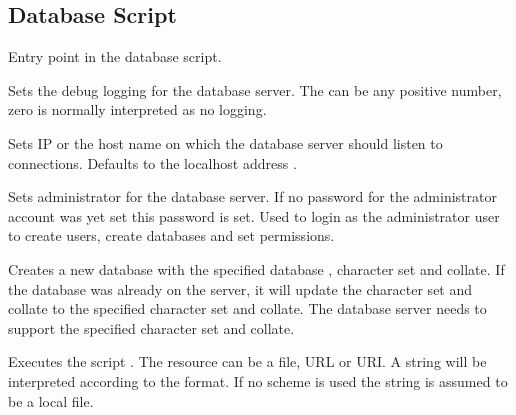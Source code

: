 \subsection{Database Script}



Entry point in the database script.


Sets the debug logging  for the database server. The 
can be any positive number, zero is normally interpreted as no logging.


Sets IP  or the host name on which the database server should listen
to connections. Defaults to the localhost address .


Sets administrator  for the database server. If no password for
the administrator account was yet set this password is set. Used to login as
the administrator user to create users, create databases and set permissions.


Creates a new database with the specified database , character set and collate.
If the database was already on the server, it will update the character set and collate
to the specified character set and collate. The database server needs to support 
the specified character set and collate.


Executes the script . The resource can be a file, URL or URI. 
A string will be interpreted according to the format. If no scheme is used 
the string is assumed to be a local file.


